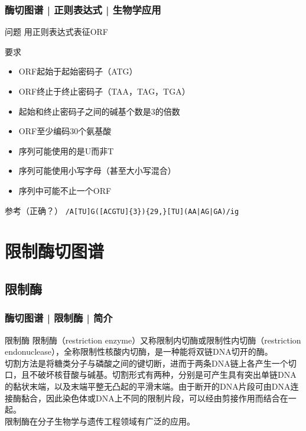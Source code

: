 \begin{frame}[fragile]
  \frametitle{酶切图谱 | 正则表达式 | 生物学应用}
  \begin{block}{问题}
    用正则表达式表征ORF
  \end{block}
  \pause
  \begin{block}{要求}
    \begin{itemize}
      \item ORF起始于起始密码子（ATG）
      \item ORF终止于终止密码子（TAA，TAG，TGA）
      \item 起始和终止密码子之间的碱基个数是3的倍数
      \item ORF至少编码30个氨基酸
      \item 序列可能使用的是U而非T
      \item 序列可能使用小写字母（甚至大小写混合）
      \item 序列中可能不止一个ORF
    \end{itemize}
  \end{block}
  \pause
  \begin{block}{参考\alert{（正确？）}}
    \verb=/A[TU]G([ACGTU]{3}){29,}[TU](AA|AG|GA)/ig=
  \end{block}
\end{frame}

\section{限制酶切图谱}
\subsection{限制酶}
\begin{frame}
  \frametitle{酶切图谱 | 限制酶 | 简介}
  \begin{block}{限制酶}
    限制酶（restriction enzyme）又称限制内切酶或限制性内切酶（restriction endonuclease），全称限制性核酸内切酶，是一种能将双链DNA切开的酶。\\
    \vspace{1em}
    切割方法是将糖类分子与磷酸之间的键切断，进而于两条DNA链上各产生一个切口，且不破坏核苷酸与碱基。切割形式有两种，分别是可产生具有突出单链DNA的黏状末端，以及末端平整无凸起的平滑末端。由于断开的DNA片段可由DNA连接酶黏合，因此染色体或DNA上不同的限制片段，可以经由剪接作用而结合在一起。\\
    \vspace{1em}
    限制酶在分子生物学与遗传工程领域有广泛的应用。
  \end{block}
\end{frame}

